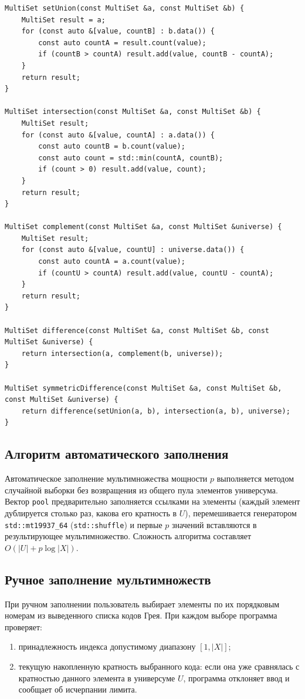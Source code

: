 \documentclass[14pt]{extreport}
\begin{document}
\begin{lstlisting}[caption={Операции над мультимножествами}, label={lst:ops}]
MultiSet setUnion(const MultiSet &a, const MultiSet &b) {
    MultiSet result = a;
    for (const auto &[value, countB] : b.data()) {
        const auto countA = result.count(value);
        if (countB > countA) result.add(value, countB - countA);
    }
    return result;
}

MultiSet intersection(const MultiSet &a, const MultiSet &b) {
    MultiSet result;
    for (const auto &[value, countA] : a.data()) {
        const auto countB = b.count(value);
        const auto count = std::min(countA, countB);
        if (count > 0) result.add(value, count);
    }
    return result;
}

MultiSet complement(const MultiSet &a, const MultiSet &universe) {
    MultiSet result;
    for (const auto &[value, countU] : universe.data()) {
        const auto countA = a.count(value);
        if (countU > countA) result.add(value, countU - countA);
    }
    return result;
}

MultiSet difference(const MultiSet &a, const MultiSet &b, const MultiSet &universe) {
    return intersection(a, complement(b, universe));
}

MultiSet symmetricDifference(const MultiSet &a, const MultiSet &b, const MultiSet &universe) {
    return difference(setUnion(a, b), intersection(a, b), universe);
}
\end{lstlisting}

{\subsection{Алгоритм автоматического заполнения}}
Автоматическое заполнение мультимножества мощности $p$ выполняется методом случайной выборки без возвращения из общего пула элементов универсума. Вектор \texttt{pool} предварительно заполняется ссылками на элементы (каждый элемент дублируется столько раз, какова его кратность в $U$), перемешивается генератором \texttt{std::mt19937\_64} (\texttt{std::shuffle}) и первые $p$ значений вставляются в результирующее мультимножество. Сложность алгоритма составляет $O(|U| + p \log |X|)$.

{\subsection{Ручное заполнение мультимножеств}}
При ручном заполнении пользователь выбирает элементы по их порядковым номерам из выведенного списка кодов Грея. При каждом выборе программа проверяет:
\begin{enumerate}
    \item принадлежность индекса допустимому диапазону $[1, |X|]$;
    \item текущую накопленную кратность выбранного кода: если она уже сравнялась с кратностью данного элемента в универсуме $U$, программа отклоняет ввод и сообщает об исчерпании лимита.
\end{enumerate}
\end{document}
